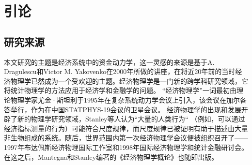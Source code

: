 \documentclass[tsinghuacite]{HustGraduPaper}
\begin{document}
	\tableofcontents
	
	\clearpage%
	
	\section{引论}
	
		\subsection{研究来源}
		
			本文研究的主题是经济系统中的资金动力学，这一灵感的来源是基于A. Dragulescu和Victor M. Yakovenko在2000年所做的讲座，在将近20年前的当时经济物理学已然成为一个受欢迎的主题。经济物理学是一门新的跨学科研究领域，它将统计物理学的方法应用于经济学和金融学的问题。 “经济物理学”一词最初由理论物理学家尤金·斯坦利于1995年在复杂系统动力学会议上引入，该会议在加尔各答举行，作为在中国STATPHYS-19会议的卫星会议\cite{chatterjee2007econophysics}\cite{carbone2007we}。 经济物理学的出现和发展开辟了新的物理学研究领域，Stanley等人认为“大量的人类行为“ （例如，可以通过经济指标测量的行为）可能符合尺度规律，而尺度规律已被证明有助于描述由大量非生物组成的系统\cite{stanley1996anomalous}。随后，世界范围内第一次经济物理学会议便被组织召开了——1997年布达佩斯经济物理国际工作室和1998年国际经济物理学和统计金融研讨会\cite{carbone2007we}。在这之后，Mantegna和Stanley编著的《经济物理学概论》也随即出版\cite{stanley1996anomalous}。
			
\end{document}
